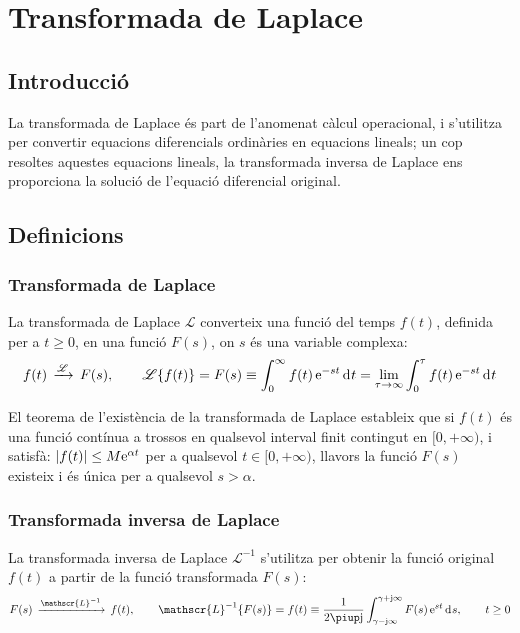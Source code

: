 \chapter{Transformada de Laplace}\label{sec:laplace}

\section{Introducció}
La transformada de Laplace és part de l'anomenat càlcul operacional,
i s'utilitza per convertir equacions diferencials ordinàries en
equacions lineals; un cop resoltes aquestes equacions lineals, la
transformada inversa de Laplace ens proporciona la solució de
l'equació diferencial original.

\section{Definicions}

\subsection{Transformada de Laplace}

La transformada de Laplace $\mathscr{L}$  converteix una funció del
temps $f(t)$, definida per a $t\geq 0$, en una funció $F(s)$, on $s$
és una variable complexa:
\begin{equation}
	f(t)\,\xrightarrow{\mathscr{L}}\,F(s), \qquad
    \mathscr{L}\{f(t)\} = F(s) \equiv \int_0^\infty f(t) \,\eu^{-s t} \diff t =
    \lim_{\tau\to\infty} \int_0^\tau f(t) \,\eu^{-s t} \diff t \label{eq:transf_laplace}
\end{equation}

El teorema de l'existència de la transformada de Laplace estableix
que si $f(t)$ és una funció contínua a trossos en qualsevol
interval finit contingut en $[0,+\infty)$, i satisfà: $|f(t)| \leq M
\mathrm{e}^{\alpha t}$ per a qualsevol $t \in [0,+\infty)$, llavors la
funció $F(s)$ existeix i és única per a
qualsevol $s > \alpha$.

\subsection{Transformada inversa de Laplace}

La transformada inversa de Laplace $\mathscr{L}^{-1}$ s'utilitza per
obtenir la funció original $f(t)$ a partir de la funció
transformada $F(s)$:
\begin{equation}
	F(s)\,\xrightarrow{\mathscr{L}^{-1}}\,f(t), \qquad
    \mathscr{L}^{-1}\{F(s)\} = f(t) \equiv \frac{1}{2 \piup \ju }
    \int_{\gamma-\ju \infty}^{\gamma+\ju \infty} F(s)\, \eu^{s t} \diff s,
    \qquad t\geq 0 \label{eq:transf_inv_laplace}
\end{equation}

